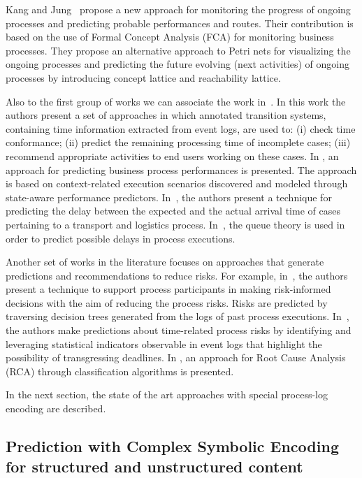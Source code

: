 Kang and Jung~\cite{doi:10.1108/02635571111137241} propose a new approach for monitoring the progress of ongoing processes and predicting probable performances and routes. Their contribution is based on the use of Formal Concept Analysis (FCA) for monitoring business processes. They propose an alternative approach to Petri nets for visualizing the ongoing processes and predicting the future evolving (next activities) of ongoing processes by introducing concept lattice and reachability lattice.   

Also to the first group of works we can associate the work in~\cite{DBLP:journals/is/AalstSS11}. In this work the authors present a set of approaches in which annotated transition systems, containing time information extracted from event logs, are used to: (i) check time conformance;
(ii) predict the remaining processing time of incomplete cases; (iii) recommend appropriate activities to end users working on these cases. In \cite{Folino}, an approach for predicting business process performances is presented. The approach is based on context-related execution scenarios discovered and modeled through state-aware performance predictors. In~\cite{Metzgeretal12}, the authors present a technique for predicting the delay between the expected and the actual arrival time of cases pertaining to a transport and logistics process. In~\cite{Senderovichetal15}, the queue theory is used in order to predict possible delays in process executions.

Another set of works in the literature focuses on approaches that generate predictions and recommendations to reduce risks. For example, in~\cite{DBLP:conf/caise/ConfortiLRA13}, the authors present a technique to support process participants in making risk-informed decisions with the aim of reducing the process risks. Risks are predicted by traversing decision trees generated from the logs of past process executions. In~\cite{Pika}, the authors make predictions about time-related process risks by identifying and leveraging statistical indicators observable in event logs  that highlight the possibility of transgressing deadlines.
In \cite{suriadi}, an approach for Root Cause Analysis (RCA) through classification algorithms is presented.

In the next section, the state of the art approaches with special process-log encoding are described.



\subsection{Prediction with Complex Symbolic Encoding for structured and unstructured content}

